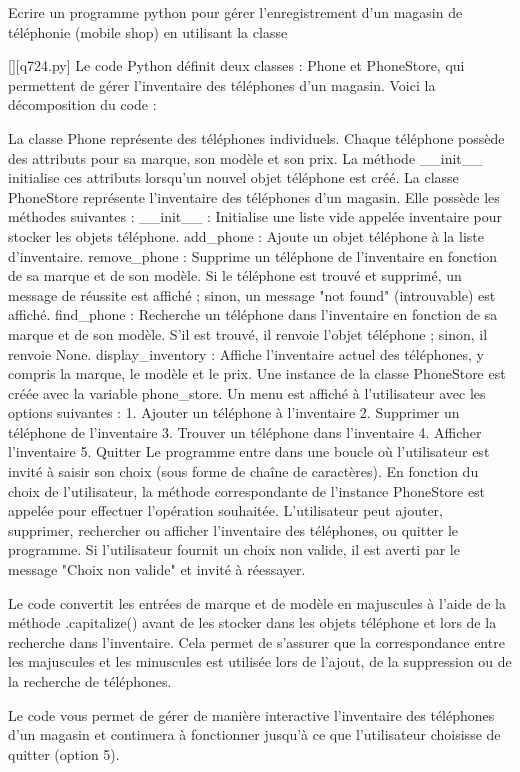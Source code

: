         \question
        Ecrire un programme python pour gérer l'enregistrement d'un magasin de téléphonie (mobile shop) en utilisant la classe
        \par
        \begin{solution}
            \renewcommand{\nomfichier}{q724.py}
            \pythonfile{\chemincode \nomfichier}[][\nomfichier]
            Le code Python définit deux classes : Phone et PhoneStore, qui permettent de gérer l'inventaire des téléphones d'un magasin. Voici la décomposition du code :

    La classe Phone représente des téléphones individuels. Chaque téléphone possède des attributs pour sa marque, son modèle et son prix. La méthode \_\_init\_\_ initialise ces attributs lorsqu'un nouvel objet téléphone est créé.
    La classe PhoneStore représente l'inventaire des téléphones d'un magasin. Elle possède les méthodes suivantes :
        \_\_init\_\_ : Initialise une liste vide appelée inventaire pour stocker les objets téléphone.
        add\_phone : Ajoute un objet téléphone à la liste d'inventaire.
        remove\_phone : Supprime un téléphone de l'inventaire en fonction de sa marque et de son modèle. Si le téléphone est trouvé et supprimé, un message de réussite est affiché ; sinon, un message "not found" (introuvable) est affiché.
        find\_phone : Recherche un téléphone dans l'inventaire en fonction de sa marque et de son modèle. S'il est trouvé, il renvoie l'objet téléphone ; sinon, il renvoie None.
        display\_inventory : Affiche l'inventaire actuel des téléphones, y compris la marque, le modèle et le prix.
    Une instance de la classe PhoneStore est créée avec la variable phone\_store.
    Un menu est affiché à l'utilisateur avec les options suivantes :
        1. Ajouter un téléphone à l'inventaire
        2. Supprimer un téléphone de l'inventaire
        3. Trouver un téléphone dans l'inventaire
        4. Afficher l'inventaire
        5. Quitter
    Le programme entre dans une boucle où l'utilisateur est invité à saisir son choix (sous forme de chaîne de caractères).
    En fonction du choix de l'utilisateur, la méthode correspondante de l'instance PhoneStore est appelée pour effectuer l'opération souhaitée. L'utilisateur peut ajouter, supprimer, rechercher ou afficher l'inventaire des téléphones, ou quitter le programme.
    Si l'utilisateur fournit un choix non valide, il est averti par le message "Choix non valide" et invité à réessayer.

Le code convertit les entrées de marque et de modèle en majuscules à l'aide de la méthode .capitalize() avant de les stocker dans les objets téléphone et lors de la recherche dans l'inventaire. Cela permet de s'assurer que la correspondance entre les majuscules et les minuscules est utilisée lors de l'ajout, de la suppression ou de la recherche de téléphones.

Le code vous permet de gérer de manière interactive l'inventaire des téléphones d'un magasin et continuera à fonctionner jusqu'à ce que l'utilisateur choisisse de quitter (option 5).
        \end{solution}
        


